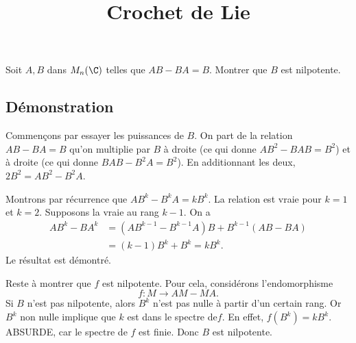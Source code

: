 \documentclass[fontsize=12pt,twoside=false,parskip=half]{scrartcl}
\title{Crochet de Lie}
\date{}
\author{}
\begin{document}
\maketitle
   \begin{Theoreme}
      Soit $A, B$ dans $M_n(\C)$ telles que $AB - BA = B$. Montrer que $B$ est nilpotente.
   \end{Theoreme}
   \subsection{Démonstration}
      Commençons par essayer les puissances de $B$. On part de la relation $AB - BA = B$ qu’on multiplie
      par $B$ à droite (ce qui donne $AB^2 - BAB = B^2$) et à droite (ce qui donne $BAB - B^2A = B^2$).
      En additionnant les deux, $2B^2 = AB^2 - B^2A$. 
      
      Montrons par récurrence que $AB^k - B^kA = kB^k$. La relation est vraie pour $k = 1$ et $k = 2$.
      Supposons la vraie au rang $k -1$. On a 
      \begin{align*}
         AB^k - BA^k &= (AB^{k - 1} - B^{k - 1}A)B + B^{k - 1}(AB - BA)\\
                     &= (k - 1)B^k + B^k = kB^k.
      \end{align*}
      Le résultat est démontré.
      
      Reste à montrer que $f$ est nilpotente. Pour cela, considérons l’endomorphisme
      \[
         f \colon M \to AM - MA.
      \]
      Si $B$ n’est pas nilpotente, alors $B^k$ n’est pas nulle à partir d’un certain rang. Or $B^k$ non nulle implique
      que $k$ est dans le spectre de$f$. En effet, $f(B^k) = kB^k$. ABSURDE, car le spectre de $f$ est finie.
      Donc $B$ est nilpotente.
\end{document}
